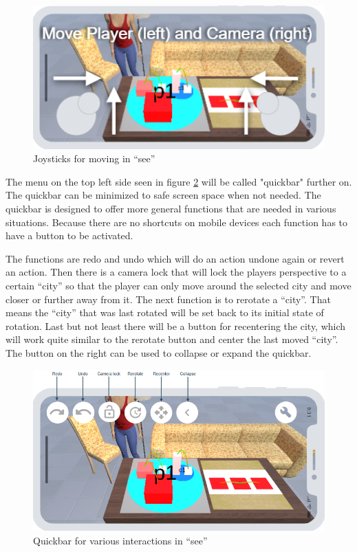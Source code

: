 \begin{figure}[htb]
    \centering
    \includegraphics[width=1\textwidth]{Concept/img/joystick.png}
    \caption{Joysticks for moving in \enquote{\gls{see}}}\label{fig:joystick}
\end{figure}

The menu on the top left side seen in figure \ref{fig:quickbar} will be called "quickbar" further on. 
The quickbar can be minimized to safe screen space when not needed. 
The quickbar is designed to offer more general functions that are needed in various situations.
Because there are no shortcuts on mobile devices each function has to have a button to be activated.

The functions are redo and undo which will do an action undone again or revert an action.
Then there is a camera lock that will lock the players perspective to a certain \enquote{\gls{city}} so that the player can only move around the selected city and move closer or further away from it.
The next function is to rerotate a \enquote{\gls{city}}.
That means the \enquote{\gls{city}} that was last rotated will be set back to its initial state of rotation.
Last but not least there will be a button for recentering the city, which will work quite similar to the rerotate button and center the last moved \enquote{\gls{city}}.
The button on the right can be used to collapse or expand the quickbar.
\begin{figure}[htb]
    \centering
    \includegraphics[width=1\textwidth]{Concept/img/quickbar.png}
    \caption{Quickbar for various interactions in \enquote{\gls{see}}}\label{fig:quickbar}
\end{figure}

